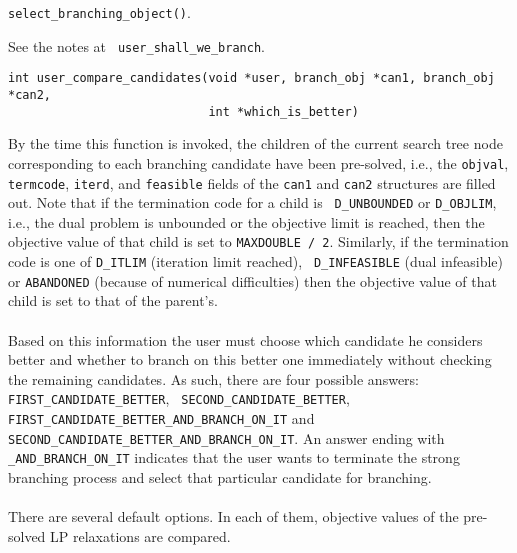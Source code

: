 \item[Wrapper invoked from:] {\tt select\_branching\_object()}.

\item[Notes:] See the notes at {\tt {}
{user_shall_we_branch}}.

\ed

\vspace{1ex}



\label{user_compare_candidates}
\begin{verbatim}
int user_compare_candidates(void *user, branch_obj *can1, branch_obj *can2,
                            int *which_is_better)
\end{verbatim}

\bd
\describe

By the time this function is invoked, the children of the current
search tree node corresponding to each branching candidate have been
pre-solved, i.e., the {\tt objval}, {\tt termcode}, {\tt iterd}, and
{\tt feasible} fields of the {\tt can1} and {\tt can2} structures are
filled out. Note that if the termination code for a child is {\tt
D\_UNBOUNDED} or {\tt D\_OBJLIM}, i.e., the dual problem is unbounded
or the objective limit is reached, then the objective value of that
child is set to {\tt MAXDOUBLE / 2}. Similarly, if the termination
code is one of {\tt D\_ITLIM} (iteration limit reached), {\tt
D\_INFEASIBLE} (dual infeasible) or {\tt ABANDONED} (because of
numerical difficulties) then the objective value of that child is set
to that of the parent's.\\
\\
Based on this information the user must choose which candidate he
considers better and whether to branch on this better one immediately
without checking the remaining candidates. As such, there are four
possible answers: {\tt FIRST\_CANDIDATE\_BETTER}, \hfill {\tt
SECOND\_CANDIDATE\_BETTER}, \hfill {\tt
FIRST\_CANDIDATE\_BETTER\_AND\_BRANCH\_ON\_IT} and {\tt
SECOND\_CANDIDATE\_BETTER\_AND\_BRANCH\_ON\_IT}. An answer ending with
{\tt \_AND\_BRANCH\_ON\_IT} indicates that the user wants to terminate
the strong branching process and select that particular candidate for
branching.\\
\\
There are several default options. In each of them, objective values of
the pre-solved LP relaxations are compared. 

